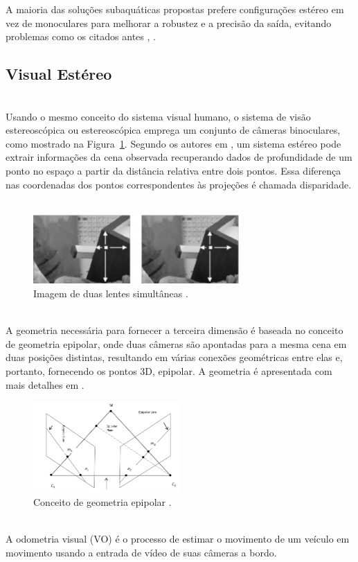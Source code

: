 A maioria das soluções subaquáticas propostas prefere configurações estéreo em vez de monoculares para melhorar a robustez e a precisão da saída, evitando problemas como os citados antes \cite{bellavia2017selective}, \cite{kim2013real}.

\subsection{Visual Estéreo}
\label{sec:visualestereo}
\ \\
Usando o mesmo conceito do sistema visual humano, o sistema de visão estereoscópica ou estereoscópica emprega um conjunto de câmeras binoculares, como mostrado na Figura~\ref{fig:Figures/ImagensSimutaneas}. Segundo os autores em \cite{stivanello2008correspondencia}, um sistema estéreo pode extrair informações da cena observada recuperando dados de profundidade de um ponto no espaço a partir da distância relativa entre dois pontos. Essa diferença nas coordenadas dos pontos correspondentes às projeções é chamada disparidade.
\ \\
\begin{figure}[!htb]
	\centering	
	\includegraphics[width=0.7\textwidth]{Figures/ImagensSimutaneas.png}
	\caption{Imagem de duas lentes simultâneas \cite{stivanello2008correspondencia}.}
	\label{fig:Figures/ImagensSimutaneas}
\end{figure}
\ \\
A geometria necessária para fornecer a terceira dimensão é baseada no conceito de geometria epipolar, onde duas câmeras são apontadas para a mesma cena em duas posições distintas, resultando em várias conexões geométricas entre elas e, portanto, fornecendo os pontos 3D, epipolar. A geometria é apresentada com mais detalhes em \cite{bappy2012study}.

\begin{figure}[!htb]
	\centering	
	\includegraphics[width=0.5\textwidth]{Figures/EpipolarGeometry.png}
	\caption{Conceito de geometria epipolar \cite{bappy2012study}.}
	\label{fig:Figures/EpipolarGeometry}
\end{figure}
\ \\
A odometria visual (VO) é o processo de estimar o movimento de um veículo em movimento usando a entrada de vídeo de suas câmeras a bordo.

